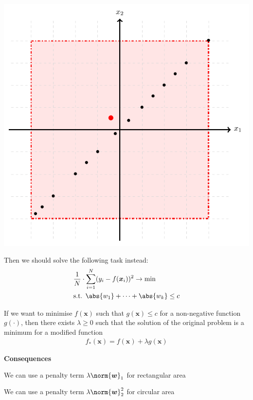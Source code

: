 \documentclass[landscape,footrule]{foils}
\renewcommand{\vec}[1]{\boldsymbol{#1}}
\begin{document}
\centerline{\includegraphics[scale=0.55]{lasso-constraint}}
\vspace*{-2ex}


Then we should solve the following task instead: \vspace*{-1.5ex}
\begin{align*}
&\frac{1}{N}\cdot\sum_{i=1}^N(y_i-f(\vec{x}_i))^2\to \min\\
&\text{s.t. } \abs{w_1}+\cdots+\abs{w_k}\leq c
\end{align*}





If we want to  minimise $f(\vec{x})$ such that $g(\vec{x})\leq c$ for a non-negative function $g(\cdot)$, then there exists             $\lambda\geq 0$ such that the solution of the original problem is a minimum for a modified function
\begin{align*}
f_*(\vec{x})=f(\vec{x}) + \lambda g(\vec{x})
\end{align*}

\textbf{Consequences}
\begin{triangles}
\item  We can use  a penalty term $\lambda \norm{\vec{w}}_1$ for rectangular area
\item We can use  a penalty term $\lambda \norm{\vec{w}}_2^2$ for circular area
\end{triangles}
\end{document}

